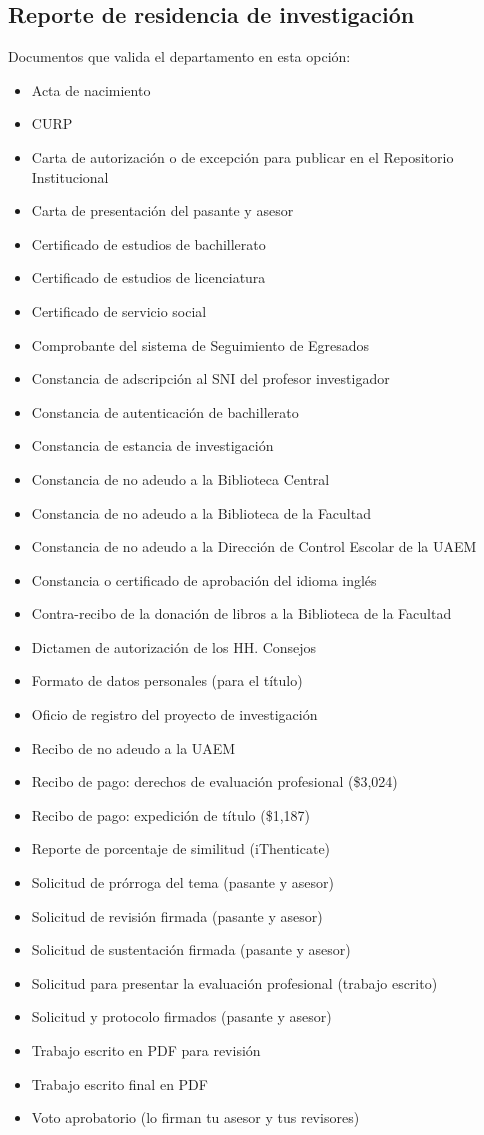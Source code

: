 \subsection{Reporte de residencia de investigación}
Documentos que valida el departamento en esta opción:
\begin{itemize}
  \item Acta de nacimiento
  \item CURP
  \item Carta de autorización o de excepción para publicar en el Repositorio Institucional
  \item Carta de presentación del pasante y asesor
  \item Certificado de estudios de bachillerato
  \item Certificado de estudios de licenciatura
  \item Certificado de servicio social
  \item Comprobante del sistema de Seguimiento de Egresados
  \item Constancia de adscripción al SNI del profesor investigador
  \item Constancia de autenticación de bachillerato
  \item Constancia de estancia de investigación
  \item Constancia de no adeudo a la Biblioteca Central
  \item Constancia de no adeudo a la Biblioteca de la Facultad
  \item Constancia de no adeudo a la Dirección de Control Escolar de la UAEM
  \item Constancia o certificado de aprobación del idioma inglés
  \item Contra-recibo de la donación de libros a la Biblioteca de la Facultad
  \item Dictamen de autorización de los HH. Consejos
  \item Formato de datos personales (para el título)
  \item Oficio de registro del proyecto de investigación
  \item Recibo de no adeudo a la UAEM
  \item Recibo de pago: derechos de evaluación profesional (\$3,024)
  \item Recibo de pago: expedición de título (\$1,187)
  \item Reporte de porcentaje de similitud (iThenticate)
  \item Solicitud de prórroga del tema (pasante y asesor)
  \item Solicitud de revisión firmada (pasante y asesor)
  \item Solicitud de sustentación firmada (pasante y asesor)
  \item Solicitud para presentar la evaluación profesional (trabajo escrito)
  \item Solicitud y protocolo firmados (pasante y asesor)
  \item Trabajo escrito en PDF para revisión
  \item Trabajo escrito final en PDF
  \item Voto aprobatorio (lo firman tu asesor y tus revisores)
\end{itemize}
